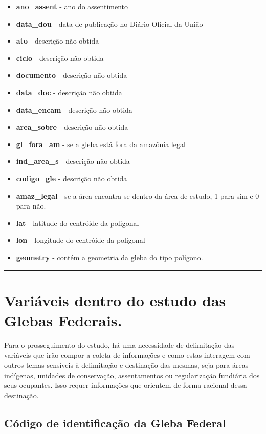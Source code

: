 \documentclass[
  letterpaper,
]{report}
\begin{document}
\begin{itemize}
\item
  \textbf{ano\_assent} - ano do assentimento
\item
  \textbf{data\_dou} - data de publicação no Diário Oficial da União
\item
  \textbf{ato} - descrição não obtida
\item
  \textbf{ciclo} - descrição não obtida
\item
  \textbf{documento} - descrição não obtida
\item
  \textbf{data\_doc} - descrição não obtida
\item
  \textbf{data\_encam} - descrição não obtida
\item
  \textbf{area\_sobre} - descrição não obtida
\item
  \textbf{gl\_fora\_am} - se a gleba está fora da amazônia legal
\item
  \textbf{ind\_area\_s} - descrição não obtida
\item
  \textbf{codigo\_gle} - descrição não obtida
\item
  \textbf{amaz\_legal} - se a área encontra-se dentro da área de estudo,
  1 para sim e 0 para não.
\item
  \textbf{lat} - latitude do centróide da poligonal
\item
  \textbf{lon} - longitude do centróide da poligonal
\item
  \textbf{geometry} - contém a geometria da gleba do tipo polígono.
\end{itemize}

\begin{center}\rule{0.5\linewidth}{0.5pt}\end{center}

\hypertarget{variuxe1veis-dentro-do-estudo-das-glebas-federais.}{%
\section{Variáveis dentro do estudo das Glebas
Federais.}\label{variuxe1veis-dentro-do-estudo-das-glebas-federais.}}

Para o prosseguimento do estudo, há uma necessidade de delimitação das
variáveis que irão compor a coleta de informações e como estas interagem
com outros temas sensíveis à delimitação e destinação das mesmas, seja
para áreas indígenas, unidades de conservação, assentamentos ou
regularização fundiária dos seus ocupantes. Isso requer informações que
orientem de forma racional dessa destinação.

\hypertarget{cuxf3digo-de-identificauxe7uxe3o-da-gleba-federal}{%
\subsection{Código de identificação da Gleba
Federal}\label{cuxf3digo-de-identificauxe7uxe3o-da-gleba-federal}}
\end{document}
